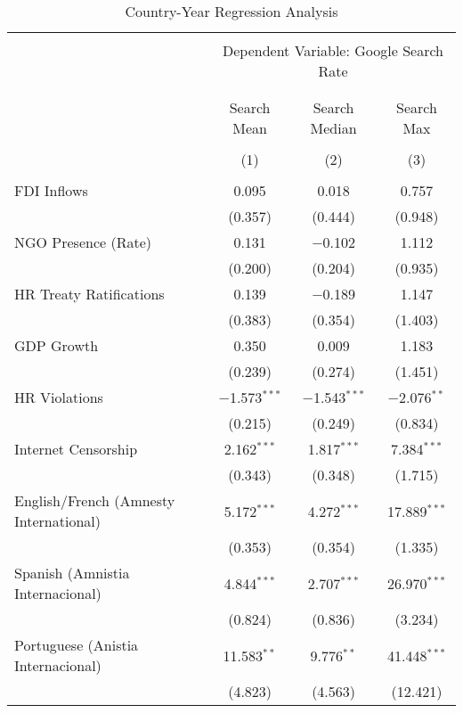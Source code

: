 
\begin{table}[!htbp] \centering 
  \caption{Country-Year Regression Analysis} 
  \label{} 
\begin{tabular}{@{\extracolsep{5pt}}lccc} 
\\[-1.8ex]\hline 
\hline \\[-1.8ex] 
 & \multicolumn{3}{c}{Dependent Variable: Google Search Rate} \\ 
\cline{2-4} 
\\[-1.8ex] & \multicolumn{3}{c}{ } \\ 
 & Search Mean & Search Median & Search Max \\ 
\\[-1.8ex] & (1) & (2) & (3)\\ 
\hline \\[-1.8ex] 
 FDI Inflows & 0.095 & 0.018 & 0.757 \\ 
  & (0.357) & (0.444) & (0.948) \\ 
  NGO Presence (Rate) & 0.131 & $-$0.102 & 1.112 \\ 
  & (0.200) & (0.204) & (0.935) \\ 
  HR Treaty Ratifications & 0.139 & $-$0.189 & 1.147 \\ 
  & (0.383) & (0.354) & (1.403) \\ 
  GDP Growth & 0.350 & 0.009 & 1.183 \\ 
  & (0.239) & (0.274) & (1.451) \\ 
  HR Violations & $-$1.573$^{***}$ & $-$1.543$^{***}$ & $-$2.076$^{**}$ \\ 
  & (0.215) & (0.249) & (0.834) \\ 
  Internet Censorship & 2.162$^{***}$ & 1.817$^{***}$ & 7.384$^{***}$ \\ 
  & (0.343) & (0.348) & (1.715) \\ 
  English/French (Amnesty International) & 5.172$^{***}$ & 4.272$^{***}$ & 17.889$^{***}$ \\ 
  & (0.353) & (0.354) & (1.335) \\ 
  Spanish (Amnistia Internacional) & 4.844$^{***}$ & 2.707$^{***}$ & 26.970$^{***}$ \\ 
  & (0.824) & (0.836) & (3.234) \\ 
  Portuguese (Anistia Internacional) & 11.583$^{**}$ & 9.776$^{**}$ & 41.448$^{***}$ \\ 
  & (4.823) & (4.563) & (12.421) \\ 

\end{tabular}
\end{table}
